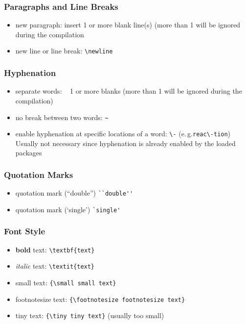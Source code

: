 \documentclass{pharmrep}
\newcommand{\eg}{e.\,g.\xspace}
\begin{document}
\subsubsection{Paragraphs and Line Breaks}
\begin{itemize}
   \item new paragraph: insert 1 or more blank line(s)  (more than 1 will be ignored during the
   compilation
   \item new line or line break: \verb|\newline|
\end{itemize}

\subsubsection{Hyphenation}
\begin{itemize}
   \item separate words: \verb| | 1 or more blanks (more than 1 will be ignored during the compilation)
   \item no break between two words: \verb|~|
   \item enable hyphenation at specific locations of a word: \verb|\-| (\eg \verb|reac\-tion|) Usually not necessary since hyphenation is already enabled by the loaded packages
\end{itemize}

\subsubsection{Quotation Marks}
\begin{itemize}
   \item quotation mark (``double'') \verb|``double''|
   \item quotation mark (`single') \verb|`single'| 
\end{itemize}

\subsubsection{Font Style}
\begin{itemize}
   \item \textbf{bold} text: \verb|\textbf{text}|
   \item \textit{italic} text: \verb|\textit{text}|
   \item {\small small text}: \verb|{\small small text}|
   \item {\footnotesize footnotesize text}: \verb|{\footnotesize footnotesize text}|
   \item {\tiny tiny text}: \verb|{\tiny tiny text}| (usually too small)
\end{itemize}
\end{document}
